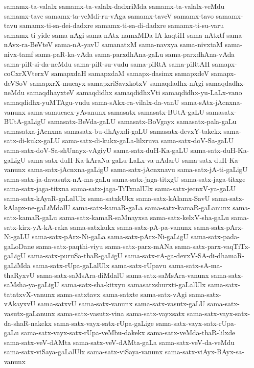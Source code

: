 {samamx-ta-valalx
samamx-ta-valalx-dadxriMda
samamx-ta-valalx-veMdu
samamx-tave
samamx-ta-veMdi-ru-vAga
samamx-taveV
samamx-tavo
samamx-tavu
samamx-ti-sa-dei-dadxre
samamx-ti-sa-di-dadxre
samamx-ti-su-varu
samamx-ti-yide
sama-nAgi
sama-nAtx-namxMDa-lA-kaqtiH
sama-nAtxtf
sama-nAvx-ra-BeVteV
sama-nA-yavU
samanatxM
sama-navxya
sama-nivxtaM
sama-nivx-tamf
sama-paR-ka-vAda
sama-parxdhAna-gaLu
sama-parxdhAna-vAda
sama-piR-si-da-neMdu
sama-piR-su-vudu
sama-piRtA
sama-piRtAH
samapx-coCxrXVterxV
samapxdaH
samapxdaM
samapx-dasimx
samapxdeV
samapx-deVSoV
samapxrX-mucayx
samapxriSavxkotxV
samaqdadhx-nAgi
samaqdadhx-neMdu
samaqdhayxteV
samaqdidhx
samaqdidhxVti
samaqdidhx-yu-LaLx-vano
samaqdidhx-yuMTAgu-vudu
sama-sAkx-ra-vilalx-da-vanU
sama-sAtx-jAcnxna-vanunx
sama-samucacx-yAvanunx
samasatx
samasatx-BUtA-gaLU
samasatx-BUtA-gaLigU
samasatx-BeVda-gaLU
samasatx-BoVgayx
samasatx-pala-gaLu
samasatxa-jAcnxna
samasatx-bu-dhAyxdi-gaLU
samasatx-devxY-takekx
sama-satx-di-kukx-gaLU
sama-satx-di-kukx-gaLa-lilxruva
sama-satx-doV-Sa-gaLU
sama-satx-doV-Sa-shUnayx-vAgiyU
sama-satx-duH-Ka-gaLU
sama-satx-duH-Ka-gaLigU
sama-satx-duH-Ka-kAraNa-gaLu-LaLx-va-nAdarU
sama-satx-duH-Ka-vanunx
sama-satx-jAcnxna-gaLigU
sama-satx-jAcnxnavu
sama-satx-jA-ti-gaLigU
sama-satx-ja-davasutx-nA-ma-gaLu
sama-satx-jaga-titxgU
sama-satx-jaga-titxge
sama-satx-jaga-titxna
sama-satx-jaga-TiTxnalUlx
sama-satx-jecnxV-ya-gaLU
sama-satx-kAyaR-gaLalUlx
sama-satxkUkx
sama-satx-kAlamx-SavU
sama-satx-kAlapx-ne-gaLiMdalU
sama-satx-kamaR-gaLa
sama-satx-kamaR-gaLanunx
sama-satx-kamaR-gaLu
sama-satx-kamaR-saMnayxsa
sama-satx-kelxV-sha-gaLu
sama-satx-kirx-yA-kA-raka
sama-satxkukx
sama-satx-pA-pa-vanunx
sama-satx-pArx-Ni-gaLU
sama-satx-pArx-Ni-gaLa
sama-satx-pArx-Ni-gaLigU
sama-satx-pada-gaLoDane
sama-satx-paqthi-viyu
sama-satx-parx-mANa
sama-satx-parx-vaqTiTx-gaLigU
sama-satx-puruSa-thaR-gaLigU
sama-satx-rA-ga-devxV-SA-di-dhamaR-gaLiMda
sama-satx-rUpa-gaLalUlx
sama-satx-rUpavu
sama-satx-sA-ma-thaRyxvU
sama-satx-saMsAra-diMdalU
sama-satx-saMsAra-vanunx
sama-satx-saMsha-ya-gaLigU
sama-satx-sha-kitxyu
samasatxshurxti-gaLalUlx
sama-satx-tatatxvX-vanunx
sama-satxtavx
sama-satxte
sama-satx-vAgi
sama-satx-vAkayxvU
sama-satxvU
sama-satx-vanunx
sama-satx-vasutx-gaLU
sama-satx-vasutx-gaLanunx
sama-satx-vasutx-vina
sama-satx-vayxsatx
sama-satx-vayx-satx-da-shaR-nakekx
sama-satx-vayx-satx-rUpa-gaLige
sama-satx-vayx-satx-rUpa-gaLu
sama-satx-vayx-satx-rUpa-veMbu-dakekx
sama-satx-veMda-thaR-lilxde
sama-satx-veV-dAMta
sama-satx-veV-dAMta-gaLa
sama-satx-veV-da-veMdu
sama-satx-viSaya-gaLalUlx
sama-satx-viSaya-vanunx
sama-satx-viAyx-BAyx-sa-vanunx
}

